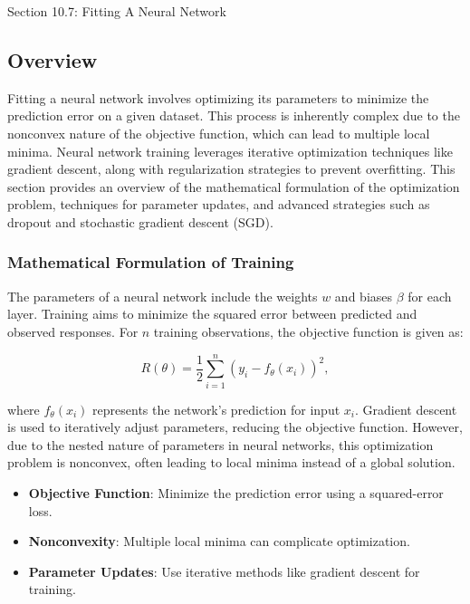 \begin{notes}{Section 10.7: Fitting A Neural Network}
    \subsection*{Overview}

    Fitting a neural network involves optimizing its parameters to minimize the prediction error on a given dataset. This process is inherently complex due to the nonconvex nature of the objective function, 
    which can lead to multiple local minima. Neural network training leverages iterative optimization techniques like gradient descent, along with regularization strategies to prevent overfitting. This section 
    provides an overview of the mathematical formulation of the optimization problem, techniques for parameter updates, and advanced strategies such as dropout and stochastic gradient descent (SGD).
    
    \subsubsection*{Mathematical Formulation of Training}
    
    The parameters of a neural network include the weights $w$ and biases $\beta$ for each layer. Training aims to minimize the squared error between predicted and observed responses. For $n$ training 
    observations, the objective function is given as:
    
    \[
    R(\theta) = \frac{1}{2} \sum_{i=1}^{n} \left( y_i - f_\theta(x_i) \right)^2,
    \]
    
    where $f_\theta(x_i)$ represents the network's prediction for input $x_i$. Gradient descent is used to iteratively adjust parameters, reducing the objective function. However, due to the nested nature of 
    parameters in neural networks, this optimization problem is nonconvex, often leading to local minima instead of a global solution.
    
    \begin{highlight}
        \begin{itemize}
            \item \textbf{Objective Function}: Minimize the prediction error using a squared-error loss.
            \item \textbf{Nonconvexity}: Multiple local minima can complicate optimization.
            \item \textbf{Parameter Updates}: Use iterative methods like gradient descent for training.
        \end{itemize}
    \end{highlight}
    

\end{notes}
